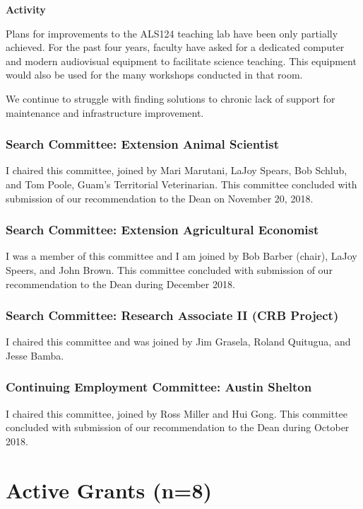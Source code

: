 \raggedright\vspace{2mm}\textbf{Activity}
	
Plans for improvements to the ALS124 teaching lab have been only partially
achieved. For the past four years, faculty have asked for a dedicated
computer and modern audiovisual equipment to facilitate science teaching. This equipment would also be used for the many workshops conducted in that room.

We continue to struggle with finding solutions to chronic lack of support for maintenance and infrastructure improvement.

\subsubsection{Search Committee: Extension Animal Scientist}

I chaired this committee, joined by Mari Marutani, LaJoy Spears,
Bob Schlub, and Tom Poole, Guam's Territorial Veterinarian. This committee concluded with submission of our recommendation to the Dean on November 20, 2018.

\subsubsection{Search Committee: Extension Agricultural Economist}

I was a member of this committee and I am joined by Bob Barber (chair),
LaJoy Speers, and John Brown. This committee concluded with submission of our recommendation to the Dean during December 2018.

\subsubsection{Search Committee: Research Associate II (CRB Project)}

I chaired this committee and was joined by Jim Grasela, Roland Quitugua,
and Jesse Bamba.

\subsubsection{Continuing Employment Committee: Austin Shelton}

I chaired this committee, joined by Ross Miller and Hui Gong. This committee concluded with submission of our recommendation to the Dean during October 2018. 

\newpage
\section{Active Grants (n=8)}
	
